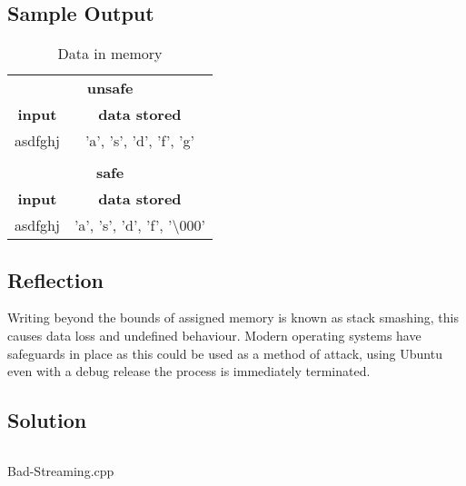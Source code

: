     \subsection*{Sample Output}
        \begin{table}[H]
            \centering
            \begin{tabular}{c c}
                \hline
                \multicolumn{2}{c}{\textbf{unsafe}} \\
                \textbf{input} & \textbf{data stored} \\
                \hline
                asdfghj & 'a', 's', 'd', 'f', 'g' \\
                \\
                \hline
                \multicolumn{2}{c}{\textbf{safe}} \\
                \textbf{input} & \textbf{data stored} \\
                \hline
                asdfghj & 'a', 's', 'd', 'f', '\textbackslash000' \\
                    
            \end{tabular}
            \caption{Data in memory}
        \end{table}

    \subsection*{Reflection}
        Writing beyond the bounds of assigned memory is known as stack smashing,
        this causes data loss and undefined behaviour. Modern operating systems
        have safeguards in place as this could be used as a method of attack,
        using Ubuntu even with a debug release the process is immediately terminated.
        
    \subsection*{Solution}
        \begin{listing}[H]
            \inputminted{cpp}{../Tasks/02-Bad-Streaming/Bad-Streaming.cpp}%
            \caption{Bad-Streaming.cpp}
        \end{listing}